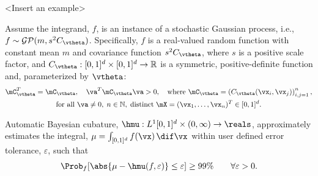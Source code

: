 <Insert an example>


\iffalse 









Assume the integrand, $f$, is an instance of a stochastic Gaussian process, i.e., $f \sim \mathcal{GP}(m,s^2 C_{\vtheta})$.  Specifically, $f$ is a real-valued random function with constant mean $m$ and covariance function $s^2C_{\vtheta}$, where $s$ is a positive scale factor, and $C_{\vtheta}: [0,1]^d \times [0,1]^d \to \mathbb{R} $ is a symmetric, positive-definite function and, parameterized by $\vtheta$:
\begin{multline} \label{FJH:eq:CondPosDef}
\mC_{\vtheta}^T = \mC_{\vtheta},  \quad {\va^T} \mC_{\vtheta} {\va} > 0, \quad \text{where }  \mC_{\vtheta} = \left(  C_{\vtheta}({\vx}_i,{\vx}_j)  \right)_{i,j=1}^n, \\
\text{for all } {\va} \ne 0, \;
n\in \mathbb{N}, \; \text{distinct} \; \mX = ({\vx}_1, \ldots, {\vx}_n)^T \in [0,1]^d.
\end{multline}

Automatic Bayesian cubature, $\hmu: L^1[0,1]^d \times (0,\infty) \to \reals$, approximately estimates the integral, $\mu = \int_{[0,1]^d} f(\vx) \, \dif \vx$ within user defined error tolerance, $\varepsilon$, 
 such that 
\[
{\Prob_f  [ }\abs{ \mu - \hmu(f,\varepsilon)} \le \varepsilon 
{ ] \ge 99\%} \qquad \forall \varepsilon > 0.
\]

